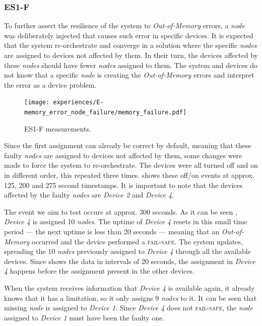 
\subsubsection{ES1-F}

To further assert the resilience of the system to \textit{Out-of-Memory} errors, a \textit{node} was deliberately injected that causes such error in specific devices. It is expected that the system re-orchestrate and converge in a solution where the specific \textit{nodes} are assigned to devices not affected by them. In their turn, the devices affected by these \textit{nodes} should have fewer \textit{nodes} assigned to them. The system and devices do not know that a specific \textit{node} is creating the \textit{Out-of-Memory} errors and interpret the error as a device problem.

\begin{figure}[H]
\centering
\texttt{[image: experiences/E-memory\_error\_node\_failure/memory\_failure.pdf]}
\caption[ES1-F measurements]{ES1-F measurements.}\label{fig:experiment_e_graph}
\end{figure}

Since the first assignment can already be correct by default, meaning that these faulty \textit{nodes} are assigned to devices not affected by them, some changes were made to force the system to re-orchestrate. The devices were all turned off and on in different order, this repeated three times.  shows these off/on events at approx. 125, 200 and 275 second timestamps. It is important to note that the devices affected by the faulty \textit{nodes} are \textit{Device 2} and \textit{Device 4}.

The event we aim to test occurs at approx. 300 seconds. As it can be seen , \textit{Device 4} is assigned 10 \textit{nodes}. The uptime of \textit{Device 4} resets in this small time period --- the next uptime is less than 20 seconds --- meaning that an \textit{Out-of-Memory} occurred and the device performed a \textsc{fail-safe}. The system updates, spreading the 10 \textit{nodes} previously assigned to \textit{Device 4} through all the available devices. Since  shows the data in intervals of 20 seconds, the assignment in \textit{Device 4} happens before the assignment present in the other devices.

When the system receives information that \textit{Device 4} is available again, it already knows that it has a limitation, so it only assigns 9 \textit{nodes} to it. It can be seen that missing \textit{node} is assigned to \textit{Device 1}. Since \textit{Device 4} does not \textsc{fail-safe}, the \textit{node} assigned to \textit{Device 1} must have been the faulty one.

